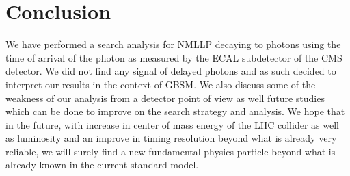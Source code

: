 \chapter{Conclusion}
\label{conclusion_chapter}
We have performed a search analysis for NMLLP decaying to photons using the time of arrival of the photon as measured by the ECAL subdetector of the CMS detector.
We did not find any signal of delayed photons and as such decided to interpret our results in the context of GBSM. We also discuss some of the weakness of our analysis from a detector point of view as well future studies  which can be done to improve on the search strategy and analysis.
We hope that in the future, with increase in center of mass energy of the LHC collider as well as luminosity and an improve in timing resolution beyond what is already very reliable, we will surely find a new fundamental physics particle beyond what is already known in the current standard model.


